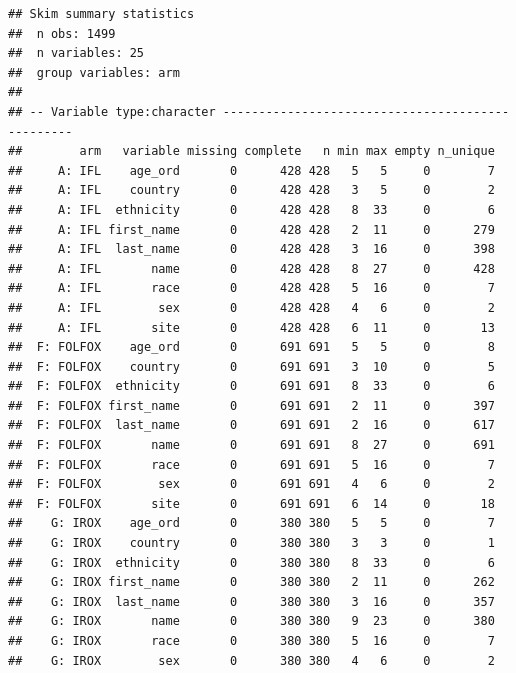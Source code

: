 \documentclass[fleqn,10pt,lineno]{wlpeerj} %
\newenvironment{Shaded}{\begin{snugshade}}{\end{snugshade}}
\newcommand{\CommentTok}[1]{\textcolor[rgb]{0.56,0.35,0.01}{\textit{#1}}}
\newcommand{\KeywordTok}[1]{\textcolor[rgb]{0.13,0.29,0.53}{\textbf{#1}}}
\newcommand{\NormalTok}[1]{#1}
\newcommand{\OperatorTok}[1]{\textcolor[rgb]{0.81,0.36,0.00}{\textbf{#1}}}
\newcommand{\StringTok}[1]{\textcolor[rgb]{0.31,0.60,0.02}{#1}}
\begin{document}
\begin{Shaded}
\end{Shaded}

\begin{verbatim}
## Skim summary statistics
##  n obs: 1499 
##  n variables: 25 
##  group variables: arm 
## 
## -- Variable type:character -------------------------------------------------
##        arm   variable missing complete   n min max empty n_unique
##     A: IFL    age_ord       0      428 428   5   5     0        7
##     A: IFL    country       0      428 428   3   5     0        2
##     A: IFL  ethnicity       0      428 428   8  33     0        6
##     A: IFL first_name       0      428 428   2  11     0      279
##     A: IFL  last_name       0      428 428   3  16     0      398
##     A: IFL       name       0      428 428   8  27     0      428
##     A: IFL       race       0      428 428   5  16     0        7
##     A: IFL        sex       0      428 428   4   6     0        2
##     A: IFL       site       0      428 428   6  11     0       13
##  F: FOLFOX    age_ord       0      691 691   5   5     0        8
##  F: FOLFOX    country       0      691 691   3  10     0        5
##  F: FOLFOX  ethnicity       0      691 691   8  33     0        6
##  F: FOLFOX first_name       0      691 691   2  11     0      397
##  F: FOLFOX  last_name       0      691 691   2  16     0      617
##  F: FOLFOX       name       0      691 691   8  27     0      691
##  F: FOLFOX       race       0      691 691   5  16     0        7
##  F: FOLFOX        sex       0      691 691   4   6     0        2
##  F: FOLFOX       site       0      691 691   6  14     0       18
##    G: IROX    age_ord       0      380 380   5   5     0        7
##    G: IROX    country       0      380 380   3   3     0        1
##    G: IROX  ethnicity       0      380 380   8  33     0        6
##    G: IROX first_name       0      380 380   2  11     0      262
##    G: IROX  last_name       0      380 380   3  16     0      357
##    G: IROX       name       0      380 380   9  23     0      380
##    G: IROX       race       0      380 380   5  16     0        7
##    G: IROX        sex       0      380 380   4   6     0        2

\end{verbatim}
\end{document}
